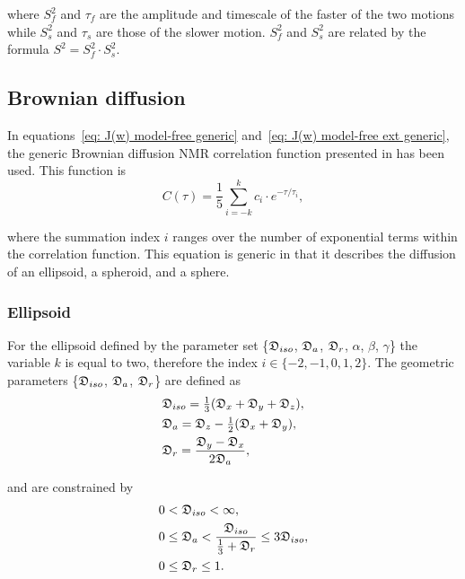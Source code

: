 \noindent where $S^2_f$ and $\tau_f$ are the amplitude and timescale of the faster of the two motions while $S^2_s$ and $\tau_s$ are those of the slower motion.  $S^2_f$ and $S^2_s$ are related by the formula $S^2 = S^2_f \cdot S^2_s$.



\subsection{Brownian diffusion}

In equations~\eqref{eq: J(w) model-free generic} and~\eqref{eq: J(w) model-free ext generic}, the generic Brownian diffusion NMR correlation function presented in \citet{dAuvergneGooley06b} has been used.  This function is
\begin{equation} \label{eq: C(tau) generic}
 C(\tau) = \frac{1}{5} \sum_{i=-k}^k c_i \cdot e^{-\tau/\tau_i},
\end{equation}

\noindent where the summation index $i$ ranges over the number of exponential terms within the correlation function.  This equation is generic in that it describes the diffusion  of an ellipsoid, a spheroid, and a sphere.


\subsubsection{Ellipsoid}
For the ellipsoid defined by the parameter set \{$\mathfrak{D}_{iso}$, $\mathfrak{D}_a$, $\mathfrak{D}_r$, $\alpha$, $\beta$, $\gamma$\} the variable $k$ is equal to two, therefore the index $i \in \{-2, -1, 0, 1, 2\}$.  The geometric parameters \{$\mathfrak{D}_{iso}$, $\mathfrak{D}_a$, $\mathfrak{D}_r$\} are defined as
\begin{subequations}
\begin{align}
 & \mathfrak{D}_{iso} = \tfrac{1}{3} (\mathfrak{D}_x + \mathfrak{D}_y + \mathfrak{D}_z ),   \label{eq: Diso ellipsoid def} \\
 & \mathfrak{D}_a = \mathfrak{D}_z - \tfrac{1}{2}(\mathfrak{D}_x + \mathfrak{D}_y),         \label{eq: Da ellipsoid def} \\
 & \mathfrak{D}_r = \frac{\mathfrak{D}_y - \mathfrak{D}_x}{2\mathfrak{D}_a},                \label{eq: Dr ellipsoid def}
\end{align}
\end{subequations}

\noindent and are constrained by
\begin{subequations}
\begin{align}
 0 & < \mathfrak{D}_{iso} < \infty,                                                    \label{eq: Diso lim} \\
 0 & \le \mathfrak{D}_a < \frac{\mathfrak{D}_{iso}}{\tfrac{1}{3} + \mathfrak{D}_r} \le 3\mathfrak{D}_{iso}, \label{eq: Da lim} \\
 0 & \le \mathfrak{D}_r \le 1.                                                         \label{eq: Dr lim}
\end{align}
\end{subequations}

